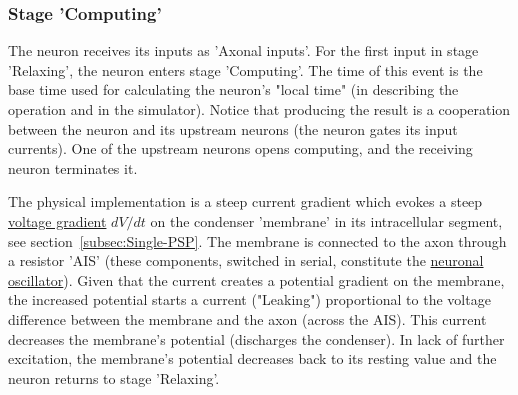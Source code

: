 

\subsubsection[Computing]{Stage 'Computing'\label{sec:Single-OperationComputing}}

The neuron receives its inputs as 'Axonal inputs'. For the first input in stage 'Relaxing',
the neuron enters stage 'Computing'. 
The  time of this event is the base time used for calculating the neuron's "local time" (in describing the operation and in the simulator). 
Notice that producing the result is a cooperation 
between the neuron and its upstream neurons (the neuron gates its input currents). One of the upstream neurons
opens computing, and the receiving neuron terminates it.


The physical implementation is
a steep current gradient which evokes a steep \hyperlink{voltage_gradient}{voltage gradient} $dV/dt$
on the condenser 'membrane' in its intracellular segment, see section~\ref{subsec:Single-PSP}. 
The membrane is connected to the axon through a resistor 
'AIS'
(these components, switched in serial, constitute the \hyperlink{PhysicsOscillator}{neuronal oscillator}).
Given that the current creates a potential gradient on the membrane, the 
increased potential starts a current ("Leaking") proportional to the voltage difference
between the membrane and the axon (across the AIS). This current decreases
the membrane's potential (discharges the condenser). In lack of further 
excitation, the membrane's potential decreases back to its resting value
and the neuron returns to stage 'Relaxing'.

